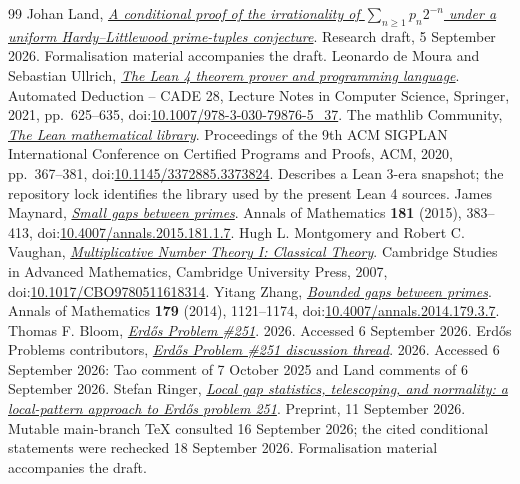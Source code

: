 \documentclass[11pt]{article}
\begin{document}
\begin{thebibliography}{99}
 Johan Land, \href{https://github.com/beetree/math_erdos_251}{\emph{A conditional proof of the irrationality of $\sum_{n\ge1}p_n2^{-n}$ under a uniform Hardy--Littlewood prime-tuples conjecture}}.
  Research draft, 5 September 2026. Formalisation material accompanies the draft.
 Leonardo de Moura and Sebastian Ullrich, \href{https://doi.org/10.1007/978-3-030-79876-5_37}{\emph{The Lean 4 theorem prover and programming language}}.
  Automated Deduction -- CADE 28, Lecture Notes in Computer Science, Springer, 2021, pp.~625--635, doi:\href{https://doi.org/10.1007/978-3-030-79876-5_37}{10.1007/978-3-030-79876-5\_37}.
 {The mathlib Community}, \href{https://doi.org/10.1145/3372885.3373824}{\emph{The Lean mathematical library}}.
  Proceedings of the 9th ACM SIGPLAN International Conference on Certified Programs and Proofs, ACM, 2020, pp.~367--381, doi:\href{https://doi.org/10.1145/3372885.3373824}{10.1145/3372885.3373824}. Describes a Lean 3-era snapshot; the repository lock identifies the library used by the present Lean 4 sources.
 James Maynard, \href{https://doi.org/10.4007/annals.2015.181.1.7}{\emph{Small gaps between primes}}.
  Annals of Mathematics \textbf{181} (2015), 383--413, doi:\href{https://doi.org/10.4007/annals.2015.181.1.7}{10.4007/annals.2015.181.1.7}.
 Hugh L. Montgomery and Robert C. Vaughan, \href{https://doi.org/10.1017/CBO9780511618314}{\emph{Multiplicative Number Theory I: Classical Theory}}.
  Cambridge Studies in Advanced Mathematics, Cambridge University Press, 2007, doi:\href{https://doi.org/10.1017/CBO9780511618314}{10.1017/CBO9780511618314}.
 Yitang Zhang, \href{https://doi.org/10.4007/annals.2014.179.3.7}{\emph{Bounded gaps between primes}}.
  Annals of Mathematics \textbf{179} (2014), 1121--1174, doi:\href{https://doi.org/10.4007/annals.2014.179.3.7}{10.4007/annals.2014.179.3.7}.
 Thomas F. Bloom, \href{https://www.erdosproblems.com/251}{\emph{Erd\H{o}s Problem \#251}}.
  2026. Accessed 6 September 2026.
 {Erdős Problems contributors}, \href{https://www.erdosproblems.com/forum/thread/251}{\emph{Erd\H{o}s Problem \#251 discussion thread}}.
  2026. Accessed 6 September 2026: Tao comment of 7 October 2025 and Land comments of 6 September 2026.
 Stefan Ringer, \href{https://github.com/StefanRinger/erdos-251}{\emph{Local gap statistics, telescoping, and normality: a local-pattern approach to Erd\H{o}s problem 251}}.
  Preprint, 11 September 2026. Mutable main-branch TeX consulted 16 September 2026; the cited conditional statements were rechecked 18 September 2026. Formalisation material accompanies the draft.

\end{thebibliography}
\end{document}
